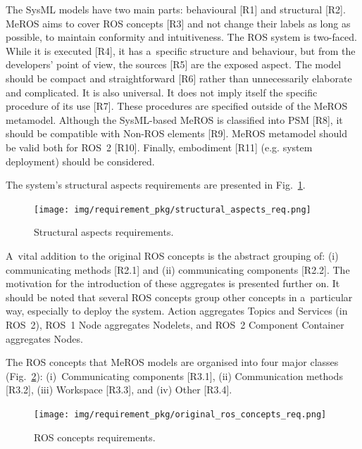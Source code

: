 \documentclass[11pt,oneside,a4paper]{report}
\begin{document}
	The SysML models have two main parts: behavioural [R1] and structural [R2]. MeROS aims to cover ROS concepts [R3] and not change their labels as long as possible, to maintain conformity and intuitiveness. The ROS system is two-faced. While it is executed [R4], it has a~specific structure and behaviour, but from the developers' point of view, the sources [R5] are the exposed aspect. The model should be compact and straightforward [R6] rather than unnecessarily elaborate and complicated. It is also universal. It does not imply itself the specific procedure of its use [R7]. These procedures are specified outside of the MeROS metamodel. Although the SysML-based MeROS is classified into PSM [R8], it should be compatible with Non-ROS elements [R9]. MeROS metamodel should be valid both for ROS~2 [R10]. Finally, embodiment [R11] (e.g. system deployment) should be considered.
	
	The system's structural aspects requirements are presented in Fig.~\ref{fig:structural_aspects_req}.
	
	\begin{figure}[H]
		\centering
		\begin{center}
			{\texttt{[image: img/requirement\_pkg/structural\_aspects\_req.png]}}
		\end{center}
		\caption{Structural aspects requirements.} 
		\label{fig:structural_aspects_req}
	\end{figure}
	
	A~vital addition to the original ROS concepts is the abstract grouping of: (i) communicating methods [R2.1] and (ii) communicating components [R2.2]. The motivation for the introduction of these aggregates is presented further on. It should be noted that several ROS concepts group other concepts in a~particular way, especially to deploy the system. Action aggregates Topics and Services (in ROS~2), ROS~1 Node aggregates Nodelets, and ROS~2 Component Container aggregates Nodes.
	
	\pagebreak
	
	The ROS concepts that MeROS models are organised into four major classes (Fig.~\ref{fig:ros_concepts_req}): (i)~Communicating components [R3.1], (ii) Communication methods [R3.2], (iii) Workspace [R3.3], and (iv) Other [R3.4].
	

	\begin{figure}[H]
		\centering
		\begin{center}
			{\texttt{[image: img/requirement\_pkg/original\_ros\_concepts\_req.png]}}
		\end{center}
		\caption{ROS concepts requirements.} 
		\label{fig:ros_concepts_req}
	\end{figure}
	
\end{document}
